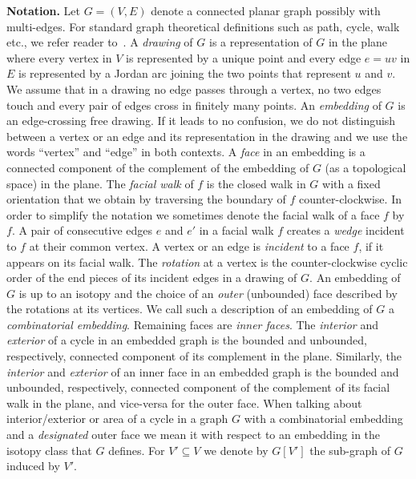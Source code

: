 \documentclass{llncs}
\begin{document}
 {\bf Notation.}
Let $G=(V,E)$ denote a connected planar graph possibly with multi-edges.
For  standard graph theoretical definitions such as path, cycle, walk etc.,
we refer reader to~\cite[Section 1]{D05}. 
A \emph{drawing} of $G$ is a representation of $G$ in the plane where every vertex
 in $V$ is represented by a unique point and every
edge $e=uv$ in $E$ is represented by a Jordan arc joining the two points that represent $u$ and $v$. 
We assume that in a drawing no edge passes through a vertex,
no two edges touch and every pair of edges cross in finitely many points.
An \emph{embedding} of $G$ is an  edge-crossing free drawing.
If it leads to no confusion, we do not distinguish between
a vertex or an edge and its representation in the drawing and we use the words ``vertex'' and ``edge'' in both
 contexts.
A  \emph{face} in an embedding is a connected component of the complement of the embedding 
of $G$ (as a topological space) in the plane.
 The \emph{facial walk} of $f$ is the closed walk in $G$ with a fixed orientation that we obtain by traversing the boundary of $f$ counter-clockwise.
In order to simplify the notation we sometimes denote the facial walk of a face $f$ by $f$. 
  A pair of consecutive edges $e$ and $e'$ in a facial walk $f$ creates a \emph{wedge} incident to $f$ at their common vertex.
  A vertex or an edge is \emph{incident} to a face $f$, if it appears on its facial walk.
The \emph{rotation} at a vertex is the counter-clockwise cyclic order of the end pieces of its incident edges
in a drawing of $G$.
An embedding of $G$ is up to an isotopy and the choice of an \emph{outer} (unbounded) face described by the rotations at its vertices. We call such a description of an embedding of $G$ a \emph{combinatorial embedding}. Remaining faces are \emph{inner faces}.
The \emph{interior} and \emph{exterior} of a cycle in an embedded graph is the bounded and unbounded, respectively, connected component
of its complement in the plane. 
Similarly, the \emph{interior} and \emph{exterior} of an inner face in an embedded graph is the bounded and unbounded, respectively, connected component
of the complement of its facial walk in the plane, and vice-versa for the outer face.
When talking  about interior/exterior or area of a cycle  
in a graph $G$ with a combinatorial embedding and a \emph{designated} outer face  we mean it with respect to an embedding in the isotopy class that $G$ defines.
For $V'\subseteq V$ we denote by $G[V']$ the sub-graph of $G$ induced by $V'$. 
\end{document}
